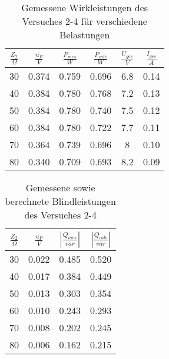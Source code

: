 \begin{table}[H]
\caption{Gemessene Wirkleistungen des Versuches 2-4 für verschiedene Belastungen}
\label{tab:Wirkleistungen}
\begin{Large}
\begin{center}
\begin{tabular}{| c | c | c | c | c | c |}
\hline
\rowcolor{blue} \color{white}$\frac{Z_2}{\Omega}$ & \color{white}$\frac{\overline{u_P}}{V}$ 
& \color{white}$\frac{P_{mes}}{W}$ & \color{white}$\frac{P_{calc}}{W}$ & \color{white}$\frac{U_{ges}}{V}$ & \color{white}$\frac{I_{ges}}{A}$\\
\hline

30 & 0.374 & 0.759 & 0.696 & 6.8 & 0.14 \\
40 & 0.384 & 0.780 & 0.768 & 7.2 & 0.13 \\
50 & 0.384 & 0.780 & 0.740 & 7.5 & 0.12 \\
60 & 0.384 & 0.780 & 0.722 & 7.7 & 0.11 \\
70 & 0.364 & 0.739 & 0.696 & 8   & 0.10 \\
80 & 0.340 & 0.709 & 0.693 & 8.2 & 0.09 \\
\hline
\end{tabular}
\end{center}
\end{Large}
\end{table}

\begin{table}[H]
\caption{Gemessene sowie berechnete Blindleistungen des Versuches 2-4}
\label{tab:Blindleistungen}
\begin{Large}
\begin{center}
\begin{tabular}{| c | c | c | c |}
\hline
\rowcolor{blue} \color{white}$\frac{Z_2}{\Omega}$ & \color{white}$\frac{\overline{u_P}}{V}$ & 
\color{white}$\left|\frac{Q_{mes}}{var}\right|$ & \color{white}$\left|\frac{Q_{calc}}{var}\right|$ \\
\hline
30 & 0.022 & 0.485 & 0.520 \\
40 & 0.017 & 0.384 & 0.449 \\
50 & 0.013 & 0.303 & 0.354 \\
60 & 0.010 & 0.243 & 0.293 \\
70 & 0.008 & 0.202 & 0.245 \\
80 & 0.006 & 0.162 & 0.215 \\
\hline
\end{tabular}
\end{center}
\end{Large}
\end{table}

